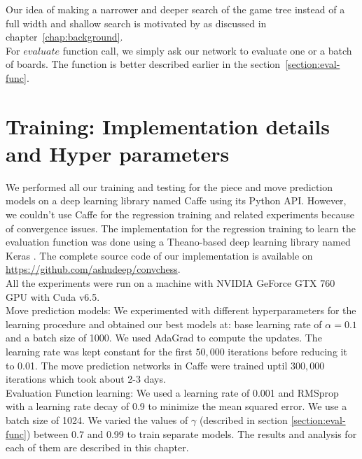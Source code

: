 Our idea of making a narrower and deeper search of the game tree instead of a 
full width and shallow search is motivated by \citealp*{de1996perception} as 
discussed in chapter~\ref{chap:background}.\\

For $evaluate$ function call, we simply ask our network to evaluate one or a 
batch of boards. The function is better described earlier in 
the section~\ref{section:eval-func}.

\section{Training: Implementation details and Hyper parameters}
\label{section:hyperparams}
We performed all our training and testing for the piece and move prediction 
models on a deep learning library named Caffe \cite{jia2014caffe} using its 
Python API. However, we couldn't use Caffe for the 
regression training and related experiments because of convergence issues. The 
implementation for the regression training to learn the 
evaluation function was done using a Theano-based deep learning library named 
Keras \cite{keras}. The complete source code of our implementation is available 
on \url{https://github.com/ashudeep/convchess}. \\

All the experiments were run on a machine with NVIDIA GeForce GTX 760 GPU with 
Cuda v6.5.\\

Move prediction models: We experimented with different hyperparameters for the 
learning procedure and 
obtained our best models at: base learning rate  of $\alpha=0.1$ and a batch 
size of 1000. We used AdaGrad to compute the updates. The learning rate was 
kept 
constant for the first $50,000$ iterations before reducing it to 0.01. The move 
prediction networks in Caffe were trained uptil $300,000$ iterations which took 
about 2-3 days.\\

Evaluation Function learning: We used a learning rate of 0.001 and RMSprop with 
a learning rate decay of 0.9 to minimize the mean squared error. We use a batch 
size of 1024. We varied the values of $\gamma$ (described in section 
\ref{section:eval-func}) between 0.7 and 0.99 to train separate models. The 
results and analysis for each of them are described in this chapter.\\
